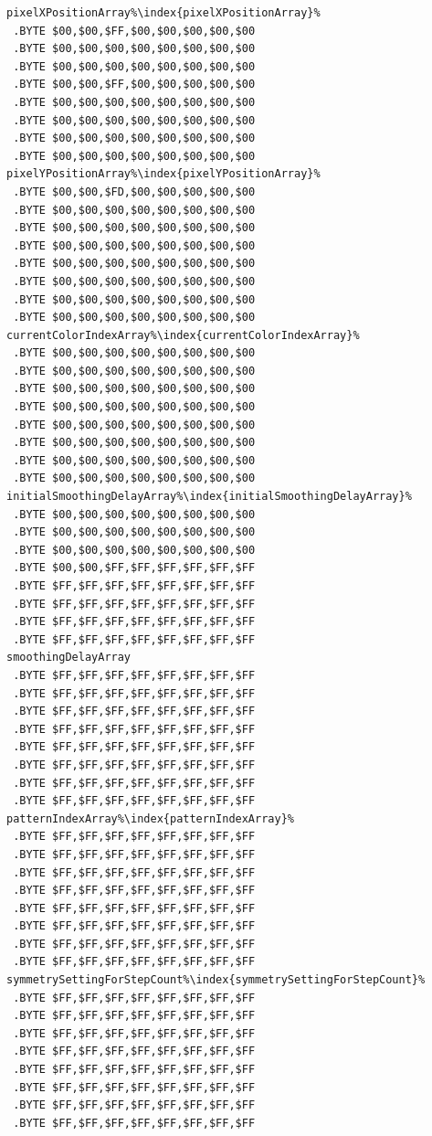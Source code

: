 \begin{minipage}[b]{0.33\linewidth}
\begin{lrbox}{\mybox}
\begin{lstlisting}[basicstyle=\ttfamily\tiny,escapechar=\%]
pixelXPositionArray%\index{pixelXPositionArray}%
 .BYTE $00,$00,$FF,$00,$00,$00,$00,$00
 .BYTE $00,$00,$00,$00,$00,$00,$00,$00
 .BYTE $00,$00,$00,$00,$00,$00,$00,$00
 .BYTE $00,$00,$FF,$00,$00,$00,$00,$00
 .BYTE $00,$00,$00,$00,$00,$00,$00,$00
 .BYTE $00,$00,$00,$00,$00,$00,$00,$00
 .BYTE $00,$00,$00,$00,$00,$00,$00,$00
 .BYTE $00,$00,$00,$00,$00,$00,$00,$00
pixelYPositionArray%\index{pixelYPositionArray}%
 .BYTE $00,$00,$FD,$00,$00,$00,$00,$00
 .BYTE $00,$00,$00,$00,$00,$00,$00,$00
 .BYTE $00,$00,$00,$00,$00,$00,$00,$00
 .BYTE $00,$00,$00,$00,$00,$00,$00,$00
 .BYTE $00,$00,$00,$00,$00,$00,$00,$00
 .BYTE $00,$00,$00,$00,$00,$00,$00,$00
 .BYTE $00,$00,$00,$00,$00,$00,$00,$00
 .BYTE $00,$00,$00,$00,$00,$00,$00,$00
currentColorIndexArray%\index{currentColorIndexArray}%
 .BYTE $00,$00,$00,$00,$00,$00,$00,$00
 .BYTE $00,$00,$00,$00,$00,$00,$00,$00
 .BYTE $00,$00,$00,$00,$00,$00,$00,$00
 .BYTE $00,$00,$00,$00,$00,$00,$00,$00
 .BYTE $00,$00,$00,$00,$00,$00,$00,$00
 .BYTE $00,$00,$00,$00,$00,$00,$00,$00
 .BYTE $00,$00,$00,$00,$00,$00,$00,$00
 .BYTE $00,$00,$00,$00,$00,$00,$00,$00
initialSmoothingDelayArray%\index{initialSmoothingDelayArray}%
 .BYTE $00,$00,$00,$00,$00,$00,$00,$00
 .BYTE $00,$00,$00,$00,$00,$00,$00,$00
 .BYTE $00,$00,$00,$00,$00,$00,$00,$00
 .BYTE $00,$00,$FF,$FF,$FF,$FF,$FF,$FF
 .BYTE $FF,$FF,$FF,$FF,$FF,$FF,$FF,$FF
 .BYTE $FF,$FF,$FF,$FF,$FF,$FF,$FF,$FF
 .BYTE $FF,$FF,$FF,$FF,$FF,$FF,$FF,$FF
 .BYTE $FF,$FF,$FF,$FF,$FF,$FF,$FF,$FF
smoothingDelayArray
 .BYTE $FF,$FF,$FF,$FF,$FF,$FF,$FF,$FF
 .BYTE $FF,$FF,$FF,$FF,$FF,$FF,$FF,$FF
 .BYTE $FF,$FF,$FF,$FF,$FF,$FF,$FF,$FF
 .BYTE $FF,$FF,$FF,$FF,$FF,$FF,$FF,$FF
 .BYTE $FF,$FF,$FF,$FF,$FF,$FF,$FF,$FF
 .BYTE $FF,$FF,$FF,$FF,$FF,$FF,$FF,$FF
 .BYTE $FF,$FF,$FF,$FF,$FF,$FF,$FF,$FF
 .BYTE $FF,$FF,$FF,$FF,$FF,$FF,$FF,$FF
patternIndexArray%\index{patternIndexArray}%
 .BYTE $FF,$FF,$FF,$FF,$FF,$FF,$FF,$FF
 .BYTE $FF,$FF,$FF,$FF,$FF,$FF,$FF,$FF
 .BYTE $FF,$FF,$FF,$FF,$FF,$FF,$FF,$FF
 .BYTE $FF,$FF,$FF,$FF,$FF,$FF,$FF,$FF
 .BYTE $FF,$FF,$FF,$FF,$FF,$FF,$FF,$FF
 .BYTE $FF,$FF,$FF,$FF,$FF,$FF,$FF,$FF
 .BYTE $FF,$FF,$FF,$FF,$FF,$FF,$FF,$FF
 .BYTE $FF,$FF,$FF,$FF,$FF,$FF,$FF,$FF
symmetrySettingForStepCount%\index{symmetrySettingForStepCount}%
 .BYTE $FF,$FF,$FF,$FF,$FF,$FF,$FF,$FF
 .BYTE $FF,$FF,$FF,$FF,$FF,$FF,$FF,$FF
 .BYTE $FF,$FF,$FF,$FF,$FF,$FF,$FF,$FF
 .BYTE $FF,$FF,$FF,$FF,$FF,$FF,$FF,$FF
 .BYTE $FF,$FF,$FF,$FF,$FF,$FF,$FF,$FF
 .BYTE $FF,$FF,$FF,$FF,$FF,$FF,$FF,$FF
 .BYTE $FF,$FF,$FF,$FF,$FF,$FF,$FF,$FF
 .BYTE $FF,$FF,$FF,$FF,$FF,$FF,$FF,$FF


\end{lstlisting}
\end{lrbox}
\end{minipage}
